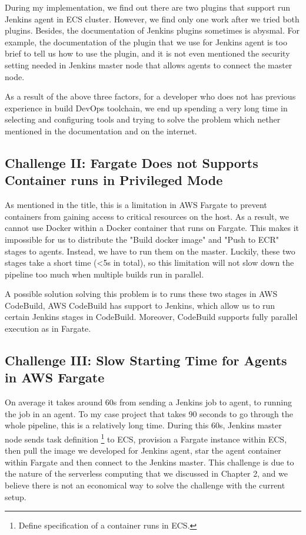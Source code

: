 During my implementation, we find out there are two plugins that support run Jenkins agent in ECS cluster. However, we find only one work after we tried both plugins. Besides, the documentation of Jenkins plugins sometimes is abysmal. For example, the documentation of the plugin that we use for Jenkins agent is too brief to tell us how to use the plugin, and it is not even mentioned the security setting needed in Jenkins master node that allows agents to connect the master node. 
\par
As a result of the above three factors, for a developer who does not has previous experience in build DevOps toolchain, we end up spending a very long time in selecting and configuring tools and trying to solve the problem which nether mentioned in the documentation and on the internet. 
\subsection{Challenge II: Fargate Does not Supports Container runs in Privileged Mode}
As mentioned in the title, this is a limitation in AWS Fargate to prevent containers from gaining access to critical resources on the host. As a result, we cannot use Docker within a Docker container that runs on Fargate. This makes it impossible for us to distribute the "Build docker image" and "Push to ECR" stages to agents. Instead, we have to run them on the master. Luckily, these two stages take a short time (<5s in total), so this limitation will not slow down the pipeline too much when multiple builds run in parallel.
\par
A possible solution solving this problem is to runs these two stages in AWS CodeBuild, AWS CodeBuild has support to Jenkins, which allow us to run certain Jenkins stages in CodeBuild. Moreover, CodeBuild supports fully parallel execution as in Fargate.
\subsection{Challenge III: Slow Starting Time for Agents in AWS Fargate}
On average it takes around 60s from sending a Jenkins job to agent, to running the job in an agent. To my case project that takes 90 seconds to go through the whole pipeline, this is a relatively long time. During this 60s, Jenkins master node sends task definition \footnote{Define specification of a container runs in ECS.} to ECS, provision a Fargate instance within ECS, then pull the image we developed for Jenkins agent, star the agent container within Fargate and then connect to the Jenkins master. This challenge is due to the nature of the serverless computing that we discussed in Chapter 2, and we believe there is not an economical way to solve the challenge with the current setup.

